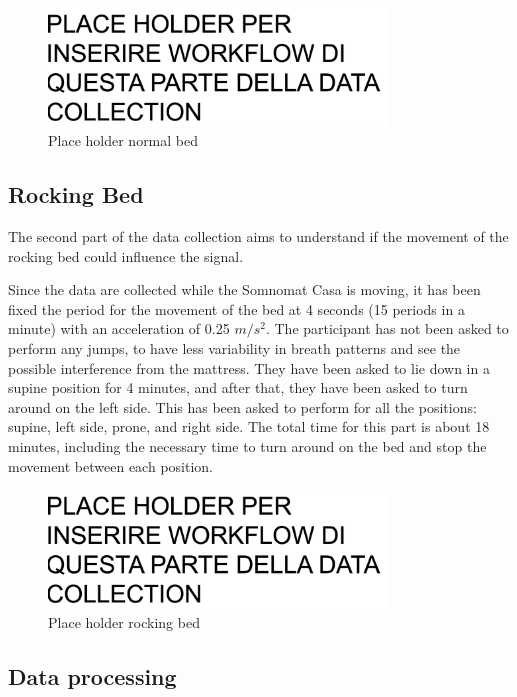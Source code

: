 \begin{figure}[H]
    \centering
    \includegraphics[width=0.8\textwidth]{img/PLACE HOLDER.pdf}
    \caption{Place holder normal bed}
    \label{fig:normalBed}
\end{figure}

\subsection{Rocking Bed}\label{cap:RockingBed}
The second part of the data collection aims to understand if the movement of the rocking bed could influence the signal.

 Since the data are collected while the Somnomat Casa is moving, it has been fixed the period for the movement of the bed at 4 seconds (15 periods in a minute) with an acceleration of 0.25 $m/s^2$. 
 The participant has not been asked to perform any jumps, to have less variability in breath patterns and see the possible interference from the mattress.
They have been asked to lie down in a supine position for 4 minutes, and after that, they have been asked to turn around on the left side. This has been asked to perform for all the positions: supine, left side, prone, and right side.
The total time for this part is about 18 minutes, including the necessary time to turn around on the bed and stop the movement between each position.


\begin{figure}[H]
    \centering
    \includegraphics[width=0.8\textwidth]{img/PLACE HOLDER.pdf}
    \caption{Place holder rocking bed}
    \label{fig:rockingBed}
\end{figure}

\subsection{Data processing} \label{cap:dataProcessing}

